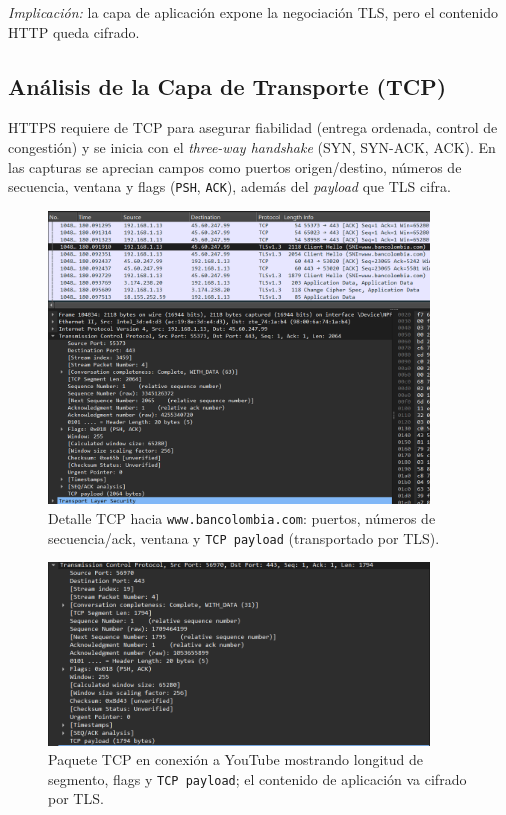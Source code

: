 \documentclass[10pt]{article}
\begin{document}
\noindent\textit{Implicación:} la capa de aplicación expone la negociación TLS, pero el contenido HTTP queda cifrado.

\subsection*{Análisis de la Capa de Transporte (TCP)}

HTTPS requiere de TCP para asegurar fiabilidad (entrega ordenada, control de congestión) y se inicia con el \textit{three-way handshake} (SYN, SYN-ACK, ACK). 
En las capturas se aprecian campos como puertos origen/destino, números de secuencia, ventana y flags (\texttt{PSH}, \texttt{ACK}), además del \textit{payload} que TLS cifra.

\begin{figure}[H]
    \centering
    \includegraphics[width=0.9\textwidth]{lab-02-screenshots/8.5-CapaTransporte-HTTPS.png}
    \caption{Detalle TCP hacia \texttt{www.bancolombia.com}: puertos, números de secuencia/ack, ventana y \texttt{TCP payload} (transportado por TLS).}
\end{figure}

\begin{figure}[H]
    \centering
    \includegraphics[width=0.9\textwidth]{lab-02-screenshots/8.5-CapaTransporte-Youtube.png}
    \caption{Paquete TCP en conexión a YouTube mostrando longitud de segmento, flags y \texttt{TCP payload}; el contenido de aplicación va cifrado por TLS.}
\end{figure}
\end{document}
